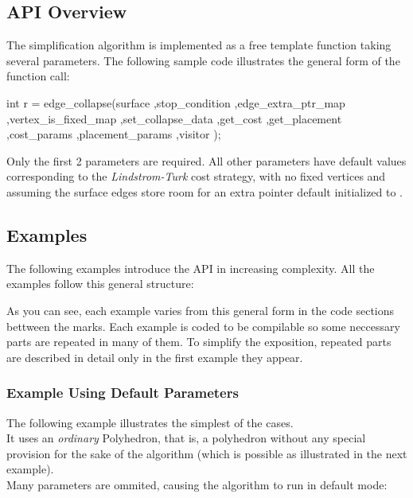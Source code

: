 \subsection{API Overview}

The simplification algorithm is implemented as a free template function taking several parameters. The following sample code illustrates the general form of the function call:

\begin{cprog}
int r = edge_collapse(surface
                     ,stop_condition
                     ,edge_extra_ptr_map
                     ,vertex_is_fixed_map
                     ,set_collapse_data
                     ,get_cost
                     ,get_placement
                     ,cost_params
                     ,placement_params
                     ,visitor 
                     );
\end{cprog}

Only the first 2 parameters are required. All other parameters have default values corresponding to the {\em Lindstrom-Turk} cost strategy, with no fixed vertices and assuming the surface edges store room for an extra pointer default initialized to .

\subsection{Examples}

The following examples introduce the API in increasing complexity. All the examples follow this general structure:


As you can see, each example varies from this general form in the code sections bettween the marks.
Each example is coded to be compilable so some neccessary parts are repeated in many of them. To simplify the exposition, repeated parts are described in detail only in the first example they appear.

\subsubsection{Example Using Default Parameters}

The following example illustrates the simplest of the cases.\\
It uses an {\em ordinary} Polyhedron, that is, a polyhedron without any special provision 
for the sake of the algorithm (which is possible as illustrated in the next example).\\
Many parameters are ommited, causing the algorithm to run in default mode:

